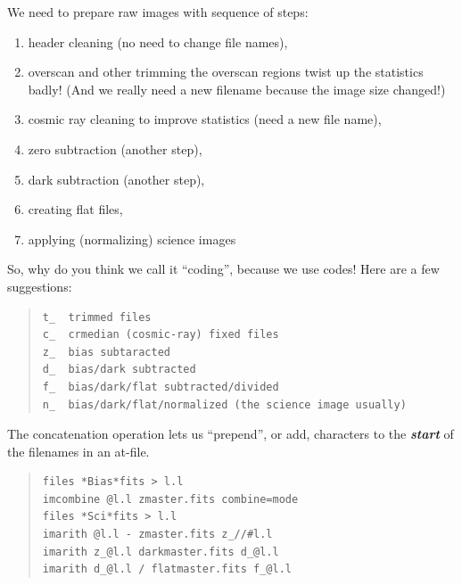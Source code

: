 \documentclass[letter,11pt,oneside]{article}
\begin{document}
We need to prepare raw images with sequence of steps:

\vspace{-.15cm}
\begin{enumerate}[resume]\addtolength{\itemsep}{-0.5\baselineskip}
   \item   header cleaning (no need to change file names),
   \item   overscan and other trimming the overscan regions twist up
the statistics badly! (And we really need a new filename because the image size changed!)
   \item   cosmic ray cleaning to improve statistics (need a new file name),
   \item   zero subtraction (another step),
   \item   dark subtraction (another step),
   \item   creating flat files,
   \item   applying (normalizing) science images
\end{enumerate}

So, why do you think we call it ``coding'', because we use codes! Here are
a few suggestions:

\begin{quote}
\begingroup \fontsize{10pt}{10pt}
\selectfont
\begin{verbatim}
t_  trimmed files
c_  crmedian (cosmic-ray) fixed files
z_  bias subtaracted
d_  bias/dark subtracted
f_  bias/dark/flat subtracted/divided
n_  bias/dark/flat/normalized (the science image usually)
\end{verbatim}
\endgroup
\end{quote}

The concatenation operation lets us ``prepend'', or add, characters to the \textbf{\emph{start}}
of the filenames in an at-file.

{\color{verbcolor}
\begin{quote}
\begingroup \fontsize{10pt}{10pt}
\selectfont
\begin{verbatim}
files *Bias*fits > l.l
imcombine @l.l zmaster.fits combine=mode
files *Sci*fits > l.l
imarith @l.l - zmaster.fits z_//#l.l
imarith z_@l.l darkmaster.fits d_@l.l
imarith d_@l.l / flatmaster.fits f_@l.l
\end{verbatim}
\endgroup
\end{quote}
}
\end{document}
